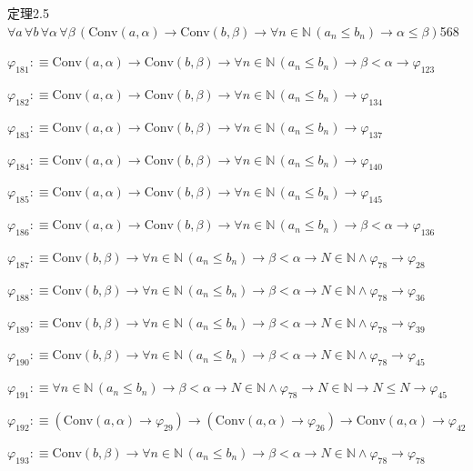\begin{fullproof}{定理2.5}{$\forall a\,\forall b\,\forall \alpha\,\forall \beta\,(\mathrm{Conv}(a,\alpha) \to \mathrm{Conv}(b,\beta) \to \forall n \in \mathbb{N}\,(a_{n} \leq b_{n}) \to \alpha \leq \beta)$}{568}
\begin{abbrevlist}
\item $\varphi_{181} :\equiv \mathrm{Conv}(a,\alpha) \to \mathrm{Conv}(b,\beta) \to \forall n \in \mathbb{N}\,(a_{n} \leq b_{n}) \to \beta < \alpha \to \varphi_{123}$
\item $\varphi_{182} :\equiv \mathrm{Conv}(a,\alpha) \to \mathrm{Conv}(b,\beta) \to \forall n \in \mathbb{N}\,(a_{n} \leq b_{n}) \to \varphi_{134}$
\item $\varphi_{183} :\equiv \mathrm{Conv}(a,\alpha) \to \mathrm{Conv}(b,\beta) \to \forall n \in \mathbb{N}\,(a_{n} \leq b_{n}) \to \varphi_{137}$
\item $\varphi_{184} :\equiv \mathrm{Conv}(a,\alpha) \to \mathrm{Conv}(b,\beta) \to \forall n \in \mathbb{N}\,(a_{n} \leq b_{n}) \to \varphi_{140}$
\item $\varphi_{185} :\equiv \mathrm{Conv}(a,\alpha) \to \mathrm{Conv}(b,\beta) \to \forall n \in \mathbb{N}\,(a_{n} \leq b_{n}) \to \varphi_{145}$
\item $\varphi_{186} :\equiv \mathrm{Conv}(a,\alpha) \to \mathrm{Conv}(b,\beta) \to \forall n \in \mathbb{N}\,(a_{n} \leq b_{n}) \to \beta < \alpha \to \varphi_{136}$
\item $\varphi_{187} :\equiv \mathrm{Conv}(b,\beta) \to \forall n \in \mathbb{N}\,(a_{n} \leq b_{n}) \to \beta < \alpha \to N \in \mathbb{N} \land \varphi_{78} \to \varphi_{28}$
\item $\varphi_{188} :\equiv \mathrm{Conv}(b,\beta) \to \forall n \in \mathbb{N}\,(a_{n} \leq b_{n}) \to \beta < \alpha \to N \in \mathbb{N} \land \varphi_{78} \to \varphi_{36}$
\item $\varphi_{189} :\equiv \mathrm{Conv}(b,\beta) \to \forall n \in \mathbb{N}\,(a_{n} \leq b_{n}) \to \beta < \alpha \to N \in \mathbb{N} \land \varphi_{78} \to \varphi_{39}$
\item $\varphi_{190} :\equiv \mathrm{Conv}(b,\beta) \to \forall n \in \mathbb{N}\,(a_{n} \leq b_{n}) \to \beta < \alpha \to N \in \mathbb{N} \land \varphi_{78} \to \varphi_{45}$
\item $\varphi_{191} :\equiv \forall n \in \mathbb{N}\,(a_{n} \leq b_{n}) \to \beta < \alpha \to N \in \mathbb{N} \land \varphi_{78} \to N \in \mathbb{N} \to N \leq N \to \varphi_{45}$
\item $\varphi_{192} :\equiv (\mathrm{Conv}(a,\alpha) \to \varphi_{29}) \to (\mathrm{Conv}(a,\alpha) \to \varphi_{26}) \to \mathrm{Conv}(a,\alpha) \to \varphi_{42}$
\item $\varphi_{193} :\equiv \mathrm{Conv}(b,\beta) \to \forall n \in \mathbb{N}\,(a_{n} \leq b_{n}) \to \beta < \alpha \to N \in \mathbb{N} \land \varphi_{78} \to \varphi_{78}$

\end{abbrevlist}
\end{fullproof}
